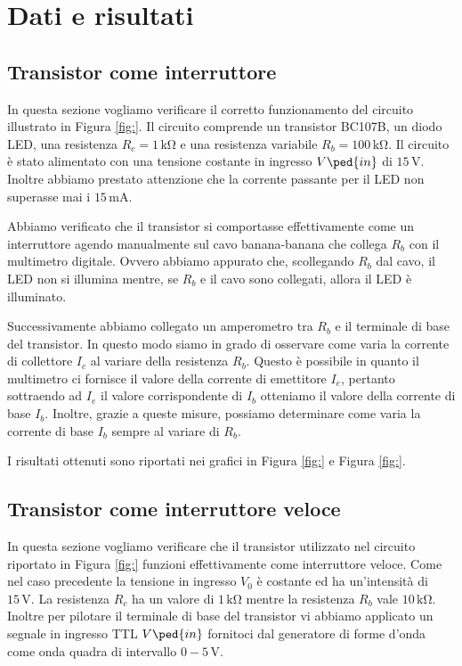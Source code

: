 \section*{Dati e risultati}

\subsection{Transistor come interruttore}

In questa sezione vogliamo verificare il corretto funzionamento del circuito illustrato in Figura \ref{fig:}.
Il circuito comprende un transistor BC107B, un diodo LED, una resistenza $R_c=1\,\si{\kilo\ohm}$ e una resistenza variabile $R_b=100\,\si{\kilo\ohm}$. Il circuito è stato alimentato con una tensione costante in ingresso $V\ped{in}$ di $15\,\si{\volt}$. Inoltre abbiamo prestato attenzione che la corrente passante per il LED non superasse mai i $15\,\si{\milli\ampere}$.

Abbiamo verificato che il transistor si comportasse effettivamente come un interruttore agendo manualmente sul cavo banana-banana che collega $R_b$ con il multimetro digitale. Ovvero abbiamo appurato che, scollegando $R_b$ dal cavo, il LED non si illumina mentre, se $R_b$ e il cavo sono collegati, allora il LED è illuminato.

Successivamente abbiamo collegato un amperometro tra $R_b$ e il terminale di base del transistor. In questo modo siamo in grado di osservare come varia la corrente di collettore $I_c$ al variare della resistenza $R_b$. Questo è possibile in quanto il multimetro ci fornisce il valore della corrente di emettitore $I_e$, pertanto sottraendo ad $I_e$ il valore corrispondente di $I_b$ otteniamo il valore della corrente di base $I_b$. Inoltre, grazie a queste misure, possiamo determinare come varia la corrente di base $I_b$ sempre al variare di $R_b$.

I risultati ottenuti sono riportati nei grafici in Figura \ref{fig:} e Figura \ref{fig:}.

\subsection{Transistor come interruttore veloce}

In questa sezione vogliamo verificare che il transistor utilizzato nel circuito riportato in Figura \ref{fig:} funzioni effettivamente come interruttore veloce.
Come nel caso precedente la tensione in ingresso $V_0$ è costante ed ha un'intensità di $15\,\si{\volt}$. La resistenza $R_c$ ha un valore di $1\,\si{\kilo\ohm}$ mentre la resistenza $R_b$ vale $10\,\si{\kilo\ohm}$. Inoltre per pilotare il terminale di base del transistor vi abbiamo applicato un segnale in ingresso TTL $V\ped{in}$ fornitoci dal generatore di forme d'onda come onda quadra di intervallo $0-5\,\si{\volt}$.  

\subsection{}

\subsection{}

\subsection{}
